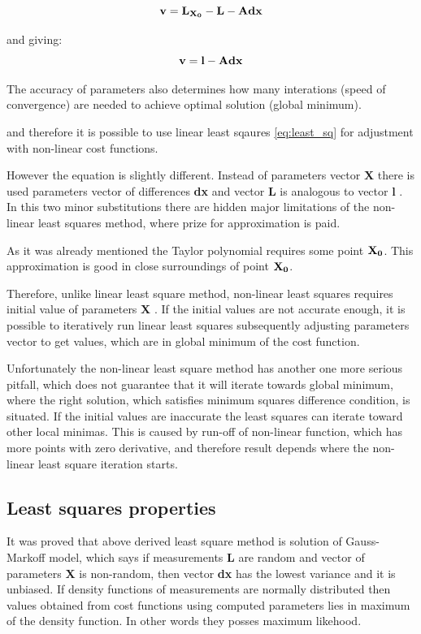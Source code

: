 \documentclass[a4paper,12pt]{report}
\newcommand{\ematr}[1]{
{\bf #1}
}
\newcommand{\evect}[1]{
{\bf #1}
}
\begin{document}
\begin{equation}
\evect{v} =  \evect{L_{X_{0}}} - \evect{L} - \ematr{A}\evect{dx}
\end{equation} 

and giving:
\begin{equation}
\evect{v} = \evect{l} - \ematr{A}\evect{dx}
\end{equation} 

The accuracy of parameters also determines how many interations (speed of convergence) are needed to achieve optimal solution (global minimum).


and therefore it is possible to use linear least sqaures \eqref{eq:least_sq} for adjustment 
with non-linear cost functions.

However the equation is slightly different. Instead of parameters vector \evect{X} there is used 
parameters vector of differences \evect{dx} and vector \evect{L} is analogous to vector \evect{l}. In this two minor 
substitutions there are hidden major limitations of the non-linear least squares method, 
where prize for approximation is paid. 

As it was already mentioned the Taylor polynomial requires some point $\evect{X_{0}}$.
This approximation is good in close surroundings of point $\evect{X_{0}}$.

Therefore, unlike linear least square method, non-linear least squares requires initial 
value of parameters \evect{X}. If the initial values are not accurate 
enough, it is possible to iteratively run linear least squares subsequently adjusting parameters vector 
to get values, which are in global minimum of the cost function. 

Unfortunately the non-linear least square method has another one more serious pitfall, which 
does not guarantee that it will iterate towards global minimum, where the right solution,
which satisfies minimum squares difference condition,  is situated. If the initial values are 
inaccurate the least squares can iterate toward other local minimas.  
This is caused by run-off of non-linear function, which has more points with zero derivative,
and therefore result depends where the non-linear least square iteration starts.


\subsection{Least squares properties}

It was proved that above derived least square method is solution of Gauss-Markoff model, which 
says if measurements \evect{L} are random and vector of parameters \evect{X} is non-random, then
vector \evect{dx}  has the lowest variance and it is unbiased. If density functions of measurements are normally 
distributed then values obtained from cost functions using  computed parameters lies in maximum of the density
function. In other words they posses maximum likehood.
\end{document}
